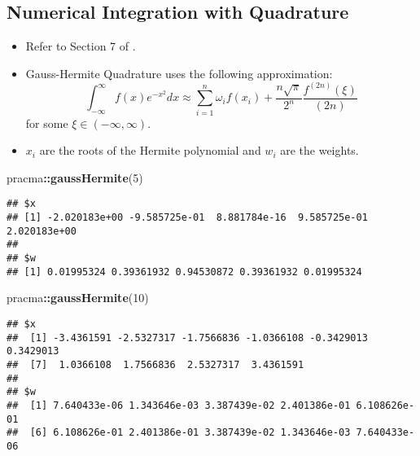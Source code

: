 \documentclass[
]{book}
\newenvironment{Shaded}{\begin{snugshade}}{\end{snugshade}}
\newcommand{\DecValTok}[1]{\textcolor[rgb]{0.00,0.00,0.81}{#1}}
\newcommand{\FunctionTok}[1]{\textcolor[rgb]{0.13,0.29,0.53}{\textbf{#1}}}
\newcommand{\NormalTok}[1]{#1}
\newcommand{\SpecialCharTok}[1]{\textcolor[rgb]{0.81,0.36,0.00}{\textbf{#1}}}
\providecommand{\tightlist}{%
  \setlength{\itemsep}{0pt}\setlength{\parskip}{0pt}}
\begin{document}
\hypertarget{numerical-integration-with-quadrature}{%
\subsection{Numerical Integration with Quadrature}\label{numerical-integration-with-quadrature}}

\begin{itemize}
\tightlist
\item
  Refer to Section 7 of \citet{Judd1998}.
\item
  Gauss-Hermite Quadrature uses the following approximation:
  \begin{equation}
  \int_{-\infty}^\infty f(x) e^{-x^2} dx \approx \sum_{i = 1}^n \omega_i f(x_i) + \frac{n\! \sqrt{\pi}}{2^n} \frac{f^{(2n)}(\xi)}{(2n)\!}
  \end{equation}
  for some \(\xi \in (-\infty, \infty)\).
\item
  \(x_i\) are the roots of the Hermite polynomial and \(w_i\) are the weights.
\end{itemize}

\begin{Shaded}
\begin{Highlighting}[]
\NormalTok{pracma}\SpecialCharTok{::}\FunctionTok{gaussHermite}\NormalTok{(}\DecValTok{5}\NormalTok{)}
\end{Highlighting}
\end{Shaded}

\begin{verbatim}
## $x
## [1] -2.020183e+00 -9.585725e-01  8.881784e-16  9.585725e-01  2.020183e+00
## 
## $w
## [1] 0.01995324 0.39361932 0.94530872 0.39361932 0.01995324
\end{verbatim}

\begin{Shaded}
\begin{Highlighting}[]
\NormalTok{pracma}\SpecialCharTok{::}\FunctionTok{gaussHermite}\NormalTok{(}\DecValTok{10}\NormalTok{)}
\end{Highlighting}
\end{Shaded}

\begin{verbatim}
## $x
##  [1] -3.4361591 -2.5327317 -1.7566836 -1.0366108 -0.3429013  0.3429013
##  [7]  1.0366108  1.7566836  2.5327317  3.4361591
## 
## $w
##  [1] 7.640433e-06 1.343646e-03 3.387439e-02 2.401386e-01 6.108626e-01
##  [6] 6.108626e-01 2.401386e-01 3.387439e-02 1.343646e-03 7.640433e-06
\end{verbatim}
\end{document}
